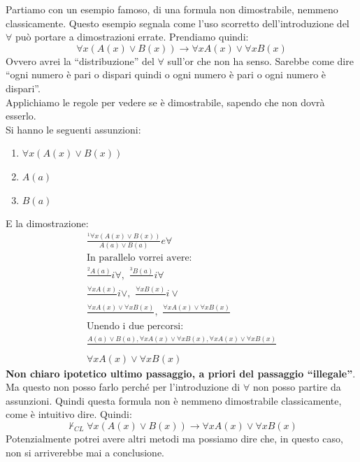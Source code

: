 \documentclass[a4paper,12pt, oneside]{book}
\begin{document}
\begin{esempio}
  Partiamo con un esempio famoso, di una formula non dimostrabile, nemmeno
  classicamente. Questo esempio segnala come l'uso scorretto dell'introduzione
  del $\forall$ può portare a dimostrazioni errate. Prendiamo quindi:
  \[\forall x(A(x)\lor B(x))\to\forall xA(x)\lor\forall xB(x)\]
  Ovvero avrei la ``distribuzione'' del $\forall$ sull'or che non ha
  senso. Sarebbe come dire ``ogni numero è pari o dispari quindi o ogni numero è
  pari o ogni numero è dispari''.\\
  Applichiamo le regole per vedere se è dimostrabile, sapendo che non dovrà
  esserlo.\\
  Si hanno le seguenti assunzioni:
  \begin{enumerate}
    \item $\forall x(A(x)\lor B(x))$
    \item $A(a)$
    \item $B(a)$
  \end{enumerate}
  E la dimostrazione:
  \begin{gather*}
    \frac{^1\forall x(A(x)\lor B(x))}{A(a)\lor B(a)}e\forall\\
    \mbox{In parallelo vorrei avere:}\\
    \frac{^2A(a)}{}i\forall,\,\,\frac{^3B(a)}{}i\forall\\
    \frac{\forall xA(x)}{}i\lor,\,\,\frac{\forall xB(x)}{}i\lor\\
    \frac{\forall xA(x)\lor\forall xB(x)}{},\,\,\frac{\forall xA(x)\lor\forall
      xB(x)}{} \\
    \mbox{Unendo i due percorsi:}\\
    \frac{A(a)\lor B(a), \forall xA(x)\lor\forall xB(x), \forall
      xA(x)\lor\forall xB(x)}{} \\
    \forall xA(x)\lor\forall xB(x)
  \end{gather*}
  \textbf{Non chiaro ipotetico ultimo passaggio, a priori del passaggio
    ``illegale''}.\\ 
  Ma questo non posso farlo perché per l'introduzione di $\forall$ non posso
  partire da assunzioni. Quindi questa formula non è nemmeno dimostrabile
  classicamente, come è intuitivo dire. Quindi:
  \[\nvdash_{CL}\forall x(A(x)\lor B(x))\to\forall xA(x)\lor\forall xB(x)\]
  Potenzialmente potrei avere altri metodi ma possiamo dire che, in questo caso,
  non si arriverebbe mai a conclusione.
\end{esempio}
\end{document}
